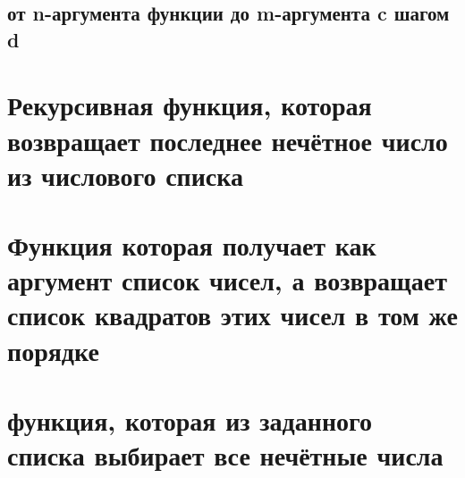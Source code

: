 
\subsection{от n-аргумента функции до m-аргумента c шагом d}




\section{Рекурсивная функция, которая возвращает последнее нечётное число из числового списка}




\section{Функция которая получает как аргумент список чисел, а возвращает список квадратов этих чисел в том же порядке}




\section{функция, которая из заданного списка выбирает все нечётные числа}

